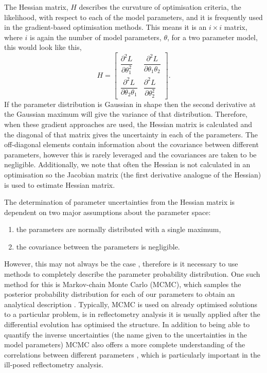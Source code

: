 \documentclass[
 reprint,
 superscriptaddress,
 amsmath,amssymb,
 aps,
]{revtex4-1}
\begin{document}
The Hessian matrix, $H$ describes the curvature of optimisation criteria, the likelihood, with respect to each of the model parameters, and it is frequently used in the gradient-based optimisation methods. 
This means it is an $i\times i$ matrix, where $i$ is again the number of model parameters, $\theta$, for a two parameter model, this would look like this,
%
\begin{equation}
    H = 
    \left[\begin{matrix}
        \dfrac{\partial^2 L}{\partial \theta_{1}^2} & \dfrac{\partial^2 L}{\partial \theta_1 \theta_2} \\[6pt]
        \dfrac{\partial^2 L}{\partial \theta_2 \theta_1} & \dfrac{\partial^2 L}{\partial \theta_{2}^2}
    \end{matrix}\right].
\end{equation}
%
If the parameter distribution is Gaussian in shape then the second derivative at the Gaussian maximum will give the variance of that distribution. 
Therefore, when these gradient approaches are used, the Hessian matrix is calculated and the diagonal of that matrix gives the uncertainty in each of the parameters. 
The off-diagonal elements contain information about the covariance between different parameters, however this is rarely leveraged and the covariances are taken to be negligible. 
Additionally, we note that often the Hessian is not calculated in an optimisation so the Jacobian matrix (the first derivative analogue of the Hessian) is used to estimate Hessian matrix. 

The determination of parameter uncertainties from the Hessian matrix is dependent on two major assumptions about the parameter space:
\begin{enumerate}
    \item {the parameters are normally distributed with a single maximum,}
    \item {the covariance between the parameters is negligible.}
\end{enumerate}
However, this may not always be the case \cite{mccluskey_bayesian_2019}, therefore is it necessary to use methods to completely describe the parameter probability distribution.
One such method for this is Markov-chain Monte Carlo (MCMC), which samples the posterior probability distribution for each of our parameters to obtain an analytical description \cite{sivia_data_2006}.
Typically, MCMC is used on already optimised solutions to a particular problem, is in reflectometry analysis it is usually applied after the differential evolution has optimised the structure. 
In addition to being able to quantify the inverse uncertainties (the name given to the uncertainties in the model parameters) MCMC also offers a more complete understanding of the correlations between different parameters \cite{gilks_markov_1995}, which is particularly important in the ill-posed reflectometry analysis. 
\end{document}
